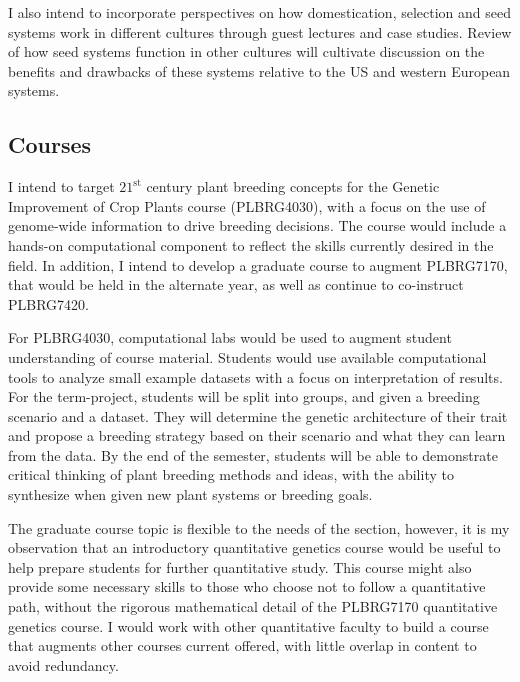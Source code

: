 \documentclass[11pt]{article}
\begin{document}
I also intend to incorporate perspectives on how domestication, selection and seed systems work in different cultures through guest lectures and case studies. Review of how seed systems function in other cultures will cultivate discussion on the benefits and drawbacks of these systems relative to the US and western European systems. 

\subsection*{Courses}

I intend to target $21^\text{st}$ century plant breeding concepts for the Genetic Improvement of Crop Plants course (PLBRG4030), with a focus on the use of genome-wide information to drive breeding decisions. The course would include a hands-on computational component to reflect the skills currently desired in the field. In addition, I intend to develop a graduate course to augment PLBRG7170, that would be held in the alternate year, as well as continue to co-instruct PLBRG7420. 


For PLBRG4030, computational labs would be used to augment student understanding of course material. Students would use available computational tools to analyze small example datasets with a focus on interpretation of results. For the term-project, students will be split into groups, and given a breeding scenario and a dataset. They will determine the genetic architecture of their trait and propose a breeding strategy based on their scenario and what they can learn from the data. By the end of the semester, students will be able to demonstrate critical thinking of plant breeding methods and ideas, with the ability to synthesize when given new plant systems or breeding goals. 


The graduate course topic is flexible to the needs of the section, however, it is my observation that an introductory quantitative genetics course would be useful to help prepare students for further quantitative study. This course might also provide some necessary skills to those who choose not to follow a quantitative path, without the rigorous mathematical detail of the PLBRG7170 quantitative genetics course. I would work with other quantitative faculty to build a course that augments other courses current offered, with little overlap in content to avoid redundancy. 
\end{document}
